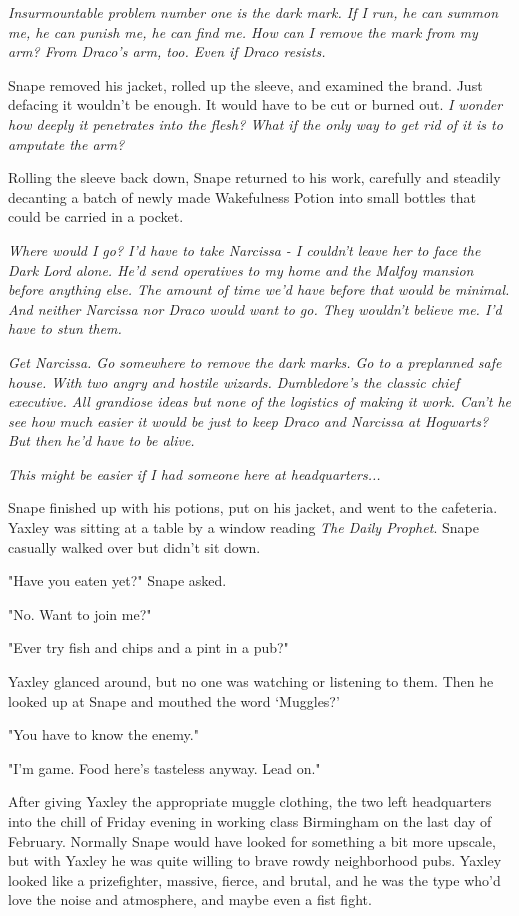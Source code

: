 \emph{Insurmountable problem number one is the dark mark. If I run, he can summon me, he can punish me, he can find me. How can I remove the mark from my arm? From Draco's arm, too. Even if Draco resists.}

Snape removed his jacket, rolled up the sleeve, and examined the brand. Just defacing it wouldn't be enough. It would have to be cut or burned out. \emph{I wonder how deeply it penetrates into the flesh? What if the only way to get rid of it is to amputate the arm?}

Rolling the sleeve back down, Snape returned to his work, carefully and steadily decanting a batch of newly made Wakefulness Potion into small bottles that could be carried in a pocket.

\emph{Where would I go? I'd have to take Narcissa - I couldn't leave her to face the Dark Lord alone. He'd send operatives to my home and the Malfoy mansion before anything else. The amount of time we'd have before that would be minimal. And neither Narcissa nor Draco would want to go. They wouldn't believe me. I'd have to stun them.}

\emph{Get Narcissa. Go somewhere to remove the dark marks. Go to a preplanned safe house. With two angry and hostile wizards. Dumbledore's the classic chief executive. All grandiose ideas but none of the logistics of making it work. Can't he see how much easier it would be just to keep Draco and Narcissa at Hogwarts? But then he'd have to be alive.}

\emph{This might be easier if I had someone here at headquarters...}

Snape finished up with his potions, put on his jacket, and went to the cafeteria. Yaxley was sitting at a table by a window reading \emph{The Daily Prophet}. Snape casually walked over but didn't sit down.

"Have you eaten yet?" Snape asked.

"No. Want to join me?"

"Ever try fish and chips and a pint in a pub?"

Yaxley glanced around, but no one was watching or listening to them. Then he looked up at Snape and mouthed the word `Muggles?'

"You have to know the enemy."

"I'm game. Food here's tasteless anyway. Lead on."

After giving Yaxley the appropriate muggle clothing, the two left headquarters into the chill of Friday evening in working class Birmingham on the last day of February. Normally Snape would have looked for something a bit more upscale, but with Yaxley he was quite willing to brave rowdy neighborhood pubs. Yaxley looked like a prizefighter, massive, fierce, and brutal, and he was the type who'd love the noise and atmosphere, and maybe even a fist fight.

